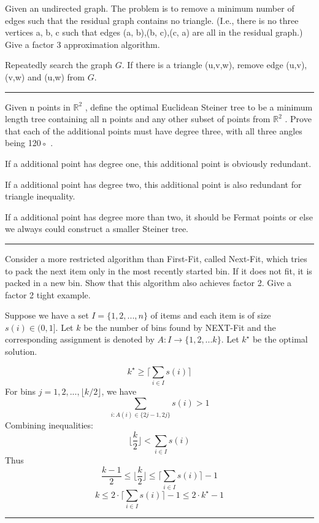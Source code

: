 \documentclass[twoside]{article}
\newenvironment{problem}[2][Problem]{\begin{trivlist}
		\item[\hskip \labelsep {\bfseries #1}\hskip \labelsep {\bfseries #2.}]}{\end{trivlist}}
\newenvironment{solution}{{\bf Solution:}}{\hfill\rule{2mm}{2mm}}
\begin{document}
\begin{problem}{3}
	Given an undirected graph. The problem is to remove a minimum number of edges such
	that the residual graph contains no triangle. (I.e., there is no three vertices a, b, c such that edges
	(a, b),(b, c),(c, a) are all in the residual graph.) Give a factor 3 approximation algorithm.
\end{problem}

\begin{solution}

Repeatedly search the graph $G$. If there is a triangle (u,v,w), remove edge (u,v),(v,w) and (u,w) from $G$.

\end{solution}

\begin{problem}{4}
	Given n points in $\mathbb{R}^2$
	, define the optimal Euclidean Steiner tree to be a minimum length tree
	containing all n points and any other subset of points from $\mathbb{R}^2$
	. Prove that each of the additional
	points must have degree three, with all three angles being 120◦	.

\end{problem} 
\begin{solution}
	
	If a additional point has degree one, this additional point is obviously redundant.
	
	If a additional point has degree two,  this additional point is also redundant for	triangle inequality.
	
	If a additional point has degree more than two, it should be Fermat points or else we always could construct a smaller Steiner tree.

\end{solution}

\begin{problem}{5}
Consider a more restricted algorithm than First-Fit, called Next-Fit, which tries to pack the next
item only in the most recently started bin. If it does not fit, it is packed in a new bin. Show that this
algorithm also achieves factor 2. Give a factor 2 tight example.
\end{problem} 

\begin{solution}
	
	Suppose we have a set $I = \{1,2,...,n\}$ of items and each item is of size $s(i) \in (0,1]$. Let $k$ be the number of bins found by NEXT-Fit and the corresponding assignment is denoted by $A:I\rightarrow\{1,2,...k\}$. Let $k^\star$ be the optimal solution.
	
	$$
	k^\star \ge \lceil \sum_{i\in I}s(i)\rceil
	$$
	For bins $j = 1,2,...,\lfloor k/2 \rfloor$, we have
	$$
	\sum_{i:A(i)\in \{2j-1,2j\}}s(i) > 1
	$$
	Combining inequalities:
	$$
	\lfloor \frac{k}{2} \rfloor < \sum_{i\in I}s(i)
	$$
	Thus
	$$
	\frac{k-1}{2} \le \lfloor\frac{k}{2}\rfloor\le\lceil\sum_{i\in I}s(i)\rceil-1
	$$
	$$
	k \le 2 \cdot \lceil\sum_{i\in I}s(i)\rceil-1\le 2\cdot k^\star -1
	$$
\end{solution}
\end{document}
